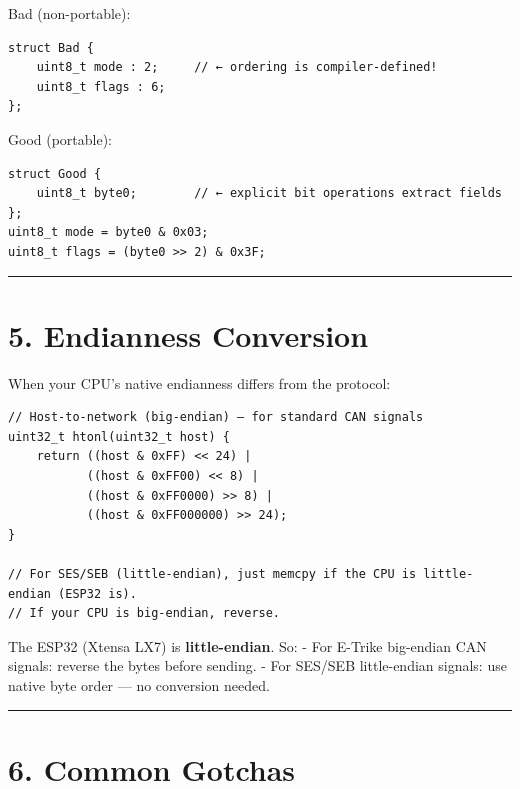 \documentclass[12pt,a4paper,oneside]{report}
\begin{document}
Bad (non-portable):

\begin{verbatim}
struct Bad {
    uint8_t mode : 2;     // ← ordering is compiler-defined!
    uint8_t flags : 6;
};
\end{verbatim}

Good (portable):

\begin{verbatim}
struct Good {
    uint8_t byte0;        // ← explicit bit operations extract fields
};
uint8_t mode = byte0 & 0x03;
uint8_t flags = (byte0 >> 2) & 0x3F;
\end{verbatim}

\begin{center}\rule{0.5\linewidth}{0.5pt}\end{center}

\section{5. Endianness Conversion}\label{endianness-conversion}

When your CPU's native endianness differs from the protocol:

\begin{verbatim}
// Host-to-network (big-endian) — for standard CAN signals
uint32_t htonl(uint32_t host) {
    return ((host & 0xFF) << 24) |
           ((host & 0xFF00) << 8) |
           ((host & 0xFF0000) >> 8) |
           ((host & 0xFF000000) >> 24);
}

// For SES/SEB (little-endian), just memcpy if the CPU is little-endian (ESP32 is).
// If your CPU is big-endian, reverse.
\end{verbatim}

The ESP32 (Xtensa LX7) is \textbf{little-endian}. So: - For E-Trike big-endian
CAN signals: reverse the bytes before sending. - For SES/SEB little-endian
signals: use native byte order --- no conversion needed.

\begin{center}\rule{0.5\linewidth}{0.5pt}\end{center}

\section{6. Common Gotchas}\label{common-gotchas}
\end{document}
